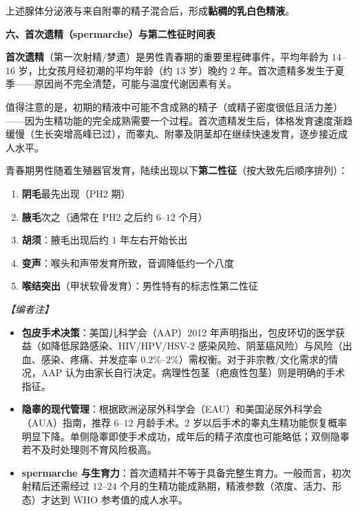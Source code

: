 \documentclass[12pt,a4paper,twoside]{ctexbook}
\begin{document}
上述腺体分泌液与来自附睾的精子混合后，形成\textbf{黏稠的乳白色精液}。

\vspace{0.3em}
\noindent\textbf{六、首次遗精（spermarche）与第二性征时间表}

\textbf{首次遗精}（第一次射精/梦遗）是男性青春期的重要里程碑事件，平均年龄为 $14$--$16$ 岁，比女孩月经初潮的平均年龄（约 $13$ 岁）晚约 $2$ 年。首次遗精多发生于夏季——原因尚不完全清楚，可能与温度代谢因素有关。

值得注意的是，初期的精液中可能不含成熟的精子（或精子密度很低且活力差）——因为生精功能的完全成熟需要一个过程。首次遗精发生后，体格发育速度渐趋缓慢（生长突增高峰已过），而睾丸、附睾及阴茎却在继续快速发育，逐步接近成人水平。

青春期男性随着生殖器官发育，陆续出现以下\textbf{第二性征}（按大致先后顺序排列）：
\begin{enumerate}
	\item \textbf{阴毛}最先出现（PH2 期）
	\item \textbf{腋毛}次之（通常在 PH2 之后约 $6$--$12$ 个月）
	\item \textbf{胡须}：腋毛出现后约 $1$ 年左右开始长出
	\item \textbf{变声}：喉头和声带发育所致，音调降低约一个八度
	\item \textbf{喉结突出}（甲状软骨发育）：男性特有的标志性第二性征
\end{enumerate}

\vspace{0.5em}
\noindent\textit{【编者注】}
\begin{itemize}
	\item \textbf{包皮手术决策}：美国儿科学会（AAP）2012 年声明指出，包皮环切的医学获益（如降低尿路感染、HIV/HPV/HSV-2 感染风险、阴茎癌风险）与风险（出血、感染、疼痛、并发症率 $0.2\%$--$2\%$）需权衡。对于非宗教/文化需求的情况，AAP 认为由家长自行决定。病理性包茎（疤痕性包茎）则是明确的手术指征。
	\item \textbf{隐睾的现代管理}：根据欧洲泌尿外科学会（EAU）和美国泌尿外科学会（AUA）指南，推荐 $6$--$12$ 月龄手术。$2$ 岁以后手术的睾丸生精功能恢复概率明显下降。单侧隐睾即使手术成功，成年后的精子浓度也可能略低；双侧隐睾若不及时处理则不育风险极高。
	\item \textbf{spermarche 与生育力}：首次遗精并不等于具备完整生育力。一般而言，初次射精后还需经过 $12$--$24$ 个月的生精功能成熟期，精液参数（浓度、活力、形态）才达到 WHO 参考值的成人水平。
\end{itemize}
\end{document}
